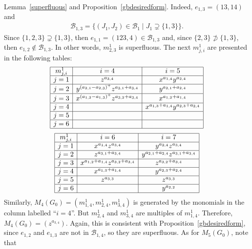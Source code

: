 \documentclass[ALCO]{cedram}
\newcommand{\mcb}{\mbox{$\mathcal{B}$}}
\begin{document}
Lemma~\ref{superfluous} and Proposition~\ref{gbdesiredform}. Indeed,
$e_{1,3}=(13,14)$ and
\begin{eqnarray*}
\mcb_{1,3}=\{(J_1,J_2)\in\mcb_1\mid J_1\supsetneq \{1,3\}\}.
\end{eqnarray*}
Since $\{1,2,3\}\supsetneq \{1,3\}$, then
$e_{1,1}=(123,4)\in\mcb_{1,3}$ and, since $\{2,3\}\not\supset
\{1,3\}$, then $e_{1,2}\not\in\mcb_{1,3}$. In other words, $m^1_{2,3}$
is superfluous. The next $m^1_{j,i}$ are presented in the following
tables:
\begin{eqnarray*}
\begin{array}{|c|c|c|}\hline 
m^1_{j,i}&i=4&i=5\\\hline
j=1&z^{a_{3,4}}&x^{a_{1,4}}y^{a_{2,4}}\\\hline
j=2&y^{(a_{2,1}-a_{2,3})^+}z^{a_{3,1}+a_{3,4}}&
y^{a_{2,1}+a_{2,4}}\\\hline
j=3&x^{(a_{1,2}-a_{1,3})^+}z^{a_{3,2}+a_{3,4}}&x^{a_{1,2}+a_{1,4}}\\\hline
j=4&&x^{a_{1,3}+a_{1,4}}y^{a_{2,3}+a_{2,4}}\\\hline
j=5&&\\\hline 
j=6&&\\\hline
\end{array}
\end{eqnarray*}
\begin{eqnarray*}
\begin{array}{|c|c|c|c|c|}\hline 
m^1_{j,i}&i=6&i=7\\\hline
j=1&x^{a_{1,4}}z^{a_{3,4}}&y^{a_{2,4}}z^{a_{3,4}}\\\hline
j=2&z^{a_{3,1}+a_{3,4}}&y^{a_{2,1}+a_{2,4}}z^{a_{3,1}+a_{3,4}}\\\hline
j=3&x^{a_{1,2}+a_{1,4}}z^{a_{3,2}+a_{3,4}}&z^{a_{3,2}+a_{3,4}}\\\hline
j=4&x^{a_{1,3}+a_{1,4}}&y^{a_{2,3}+a_{2,4}}\\\hline
j=5&z^{a_{3,3}}&z^{a_{3,3}}\\\hline 
j=6&&y^{a_{2,2}}\\\hline
\end{array}
\end{eqnarray*}%
Similarly, $M_4(G_0)=(m^1_{1,4},m^1_{2,4},m^1_{3,4})$ is generated by
the monomials in the column labelled ``$i=4$''. But $m^1_{2,4}$ and
$m^1_{3,4}$ are multiples of $m^1_{1,4}$. Therefore,
$M_4(G_0)=(z^{a_{3,4}})$. Again, this is consistent with
Proposition~\ref{gbdesiredform}, since $e_{1,2}$ and $e_{1,3}$ are not
in $\mcb_{1,4}$, so they are superfluous. As for $M_5(G_0)$, note that
\end{document}
